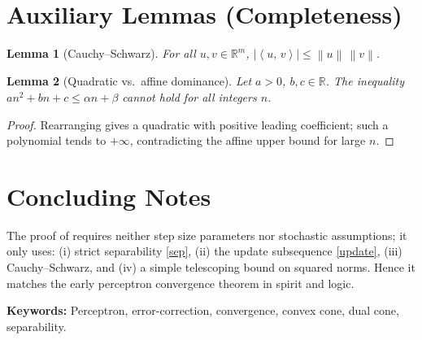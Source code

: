 \documentclass[11pt]{article}
\newtheorem{lemma}{Lemma}
\theoremstyle{remark}
\newcommand{\inner}[2]{\left\langle #1,\, #2 \right\rangle}
\newcommand{\norm}[1]{\left\lVert #1 \right\rVert}
\newcommand{\R}{\mathbb{R}}
\begin{document}
\section{Auxiliary Lemmas (Completeness)}
\begin{lemma}[Cauchy--Schwarz]
For all \(u,v\in\R^m\), \(|\inner{u}{v}|\le \norm{u}\,\norm{v}\).
\end{lemma}
\begin{lemma}[Quadratic vs.\ affine dominance]
Let \(a>0\), \(b,c\in\R\). The inequality \(a n^2 + b n + c \le \alpha n + \beta\) cannot hold for all integers \(n\).
\end{lemma}
\begin{proof}
Rearranging gives a quadratic with positive leading coefficient; such a polynomial tends to \(+\infty\),
contradicting the affine upper bound for large \(n\).
\end{proof}

\section{Concluding Notes}
The proof of  requires neither step size parameters nor stochastic assumptions;
it only uses: (i) strict separability \eqref{sep}, (ii) the update subsequence \eqref{update},
(iii) Cauchy--Schwarz, and (iv) a simple telescoping bound on squared norms.
Hence it matches the early perceptron convergence theorem in spirit and logic.

\bigskip
\noindent\textbf{Keywords:} Perceptron, error-correction, convergence, convex cone, dual cone, separability.
\end{document}
